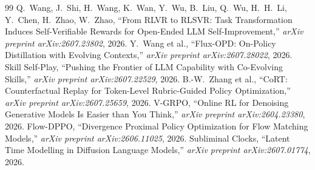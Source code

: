 \documentclass[11pt,a4paper]{article}
\begin{document}
\begin{thebibliography}{99}
 Q.\ Wang, J.\ Shi, H.\ Wang, K.\ Wan, Y.\ Wu, B.\ Liu, Q.\ Wu, H.\ H.\ Li, Y.\ Chen, H.\ Zhao, W.\ Zhao, ``From RLVR to RLSVR: Task Transformation Induces Self-Verifiable Rewards for Open-Ended LLM Self-Improvement,'' \emph{arXiv preprint arXiv:2607.23802}, 2026.
 Y.\ Wang et al., ``Flux-OPD: On-Policy Distillation with Evolving Contexts,'' \emph{arXiv preprint arXiv:2607.28022}, 2026.
 Skill Self-Play, ``Pushing the Frontier of LLM Capability with Co-Evolving Skills,'' \emph{arXiv preprint arXiv:2607.22529}, 2026.
 B.-W.\ Zhang et al., ``CoRT: Counterfactual Replay for Token-Level Rubric-Guided Policy Optimization,'' \emph{arXiv preprint arXiv:2607.25659}, 2026.
 V-GRPO, ``Online RL for Denoising Generative Models Is Easier than You Think,'' \emph{arXiv preprint arXiv:2604.23380}, 2026.
 Flow-DPPO, ``Divergence Proximal Policy Optimization for Flow Matching Models,'' \emph{arXiv preprint arXiv:2606.11025}, 2026.
 Subliminal Clocks, ``Latent Time Modelling in Diffusion Language Models,'' \emph{arXiv preprint arXiv:2607.01774}, 2026.
\end{thebibliography}
\end{document}
